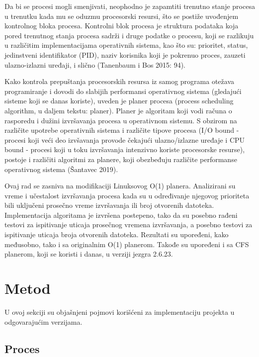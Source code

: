 Da bi se procesi mogli smenjivati, neophodno je zapamtiti trenutno stanje procesa u trenutku kada mu se oduzmu procesorski resursi, što se postiže uvođenjem kontrolnog bloka procesa. Kontrolni blok procesa je struktura podataka koja pored trenutnog stanja procesa sadrži i druge podatke o procesu, koji se razlikuju u različitim implementacijama operativnih sistema, kao što su: prioritet, status, jedinstveni identifikator (PID), naziv korisnika koji je pokrenuo proces, zauzeti ulazno-izlazni uređaji, i slično (Tanenbaum i Bos 2015: 94).

\AuthorExHere

Kako kontrola prepuštanja procesorskih resursa iz samog programa otežava programiranje i dovodi do slabijih performansi operativnog sistema (gledajući sisteme koji se danas koriste), uveden je planer procesa (process scheduling algorithm, u daljem tekstu: planer). Planer je algoritam koji vodi računa o rasporedu i dužini izvršavanja procesa u operativnom sistemu. S obzirom na različite upotrebe operativnih sistema i različite tipove procesa (I/O bound - procesi koji veći deo izvšavanja provode čekajući ulazno/izlazne uređaje i CPU bound - procesi koji u toku izvršavanja intenzivno koriste procesorske resurse), postoje i različiti algoritmi za planere, koji obezbeđuju različite performanse operativnog sistema (Šantavec 2019).

Ovaj rad se zasniva na modifikaciji Linuksovog O(1) planera. Analizirani su vreme i učestalost izvršavanja procesa kada su u određivanje njegovog prioriteta bili uključeni prosečno vreme izvršavanja ili broj otvorenih datoteka. Implementacija algoritama je izvršena postepeno, tako da su posebno rađeni testovi za ispitivanje uticaja prosečnog vremena izvršavanja, a posebno testovi za ispitivanje uticaja broja otvorenih datoteka. Rezultati su upoređeni, kako međusobno, tako i sa originalnim O(1) planerom. Takođe su upoređeni i sa CFS planerom, koji se koristi i danas, u verziji jezgra 2.6.23.

\section{Metod}

U ovoj sekciji su objašnjeni pojmovi korišćeni za implementaciju projekta u odgovarajućim verzijama.

\subsection{Proces}

